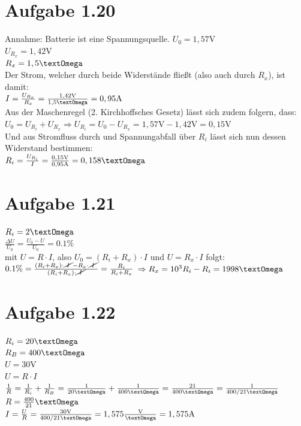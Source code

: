 \documentclass[]{article}
\newcommand{\del}[1]{\cancel{~#1~}}
\newcommand{\rarr}{\Rightarrow}
\newcommand{\unit}[1]{\text{#1}}
\newcommand{\fracunit}[2]{\frac{\unit{#1}}{\unit{#2}}}
\begin{document}
\section*{Aufgabe 1.20}
\par
	Annahme: Batterie ist eine Spannungsquelle.
	$U_0 = 1,57\unit{V}$\\
	$U_{R_x} = 1,42\unit{V}$\\
	$R_x = 1,5 \unit{\textOmega}$\\
	Der Strom, welcher durch beide Widerstände fließt (also auch durch $R_x$), ist damit:\\
	$I = \frac{U_{R_x}}{R_x} = \frac{1,42\unit{V}}{1,5\unit{\textOmega}} = 0,95\unit{A}$\\
	Aus der Maschenregel (2. Kirchhoffsches Gesetz) lässt sich zudem folgern, dass:\\
	$U_0 = U_{R_i} + U_{R_x} \rarr U_{R_i} = U_0 - U_{R_x} = 1,57\unit{V} - 1,42\unit{V} = 0,15\unit{V}$\\
	Und aus Stromfluss durch und Spannungabfall über $R_i$ lässt sich nun dessen Widerstand bestimmen:\\
	$R_i = \frac{U_{R_i}}{I} = \frac{0,15\unit{V}}{0,95\unit{A}} = 0,158\unit{\textOmega}$

\section*{Aufgabe 1.21}
\par
	$R_i = 2 \unit{\textOmega}$\\
	$\frac{\Delta U}{U_0} = \frac{U_0 - U}{U_0} = 0.1\%$\\
	mit $U = R\cdot I$, also $U_0 = (R_i+R_x) \cdot I$ und $U = R_x \cdot I$ folgt:\\
	$0.1\% = \frac{(R_i+R_x) \cdot \del{I} - R_x \cdot \del{I}}{(R_i+R_x) \cdot \del{I}} = \frac{R_i}{R_i + R_x}$
	$\rarr R_x = 10^3R_i-R_i = 1998\unit{\textOmega}$
\section*{Aufgabe 1.22}
\par
	$R_i = 20 \unit{\textOmega}$\\
	$R_B = 400 \unit{\textOmega}$\\
	$U = 30\unit{V}$\\
	$U = R\cdot I$\\
	$\frac{1}{R} = \frac{1}{R_i} + \frac{1}{R_B} = \frac{1}{20 \unit{\textOmega}} + \frac{1}{400 \unit{\textOmega}} = \frac{21}{400 \unit{\textOmega}} = \frac{1}{400/21\unit{\textOmega}}$\\
	$R = \frac{400}{21}\unit{\textOmega}$\\
	$I = \frac{U}{R} = \frac{30\unit{V}}{400/21\unit{\textOmega}} = 1,575 \fracunit{V}{\textOmega} = 1,575\unit{A} $
\end{document}
